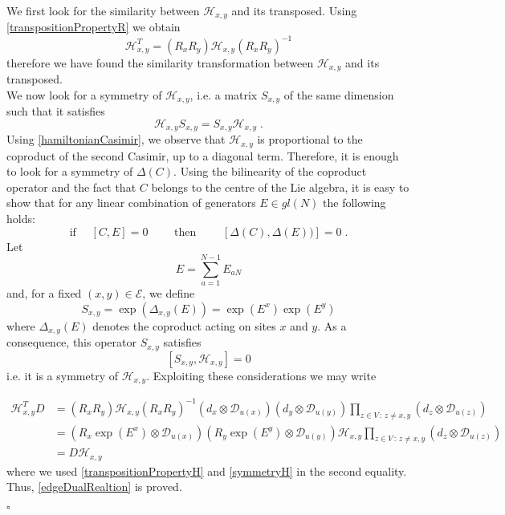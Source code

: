 \documentclass[10pt]{article}
\numberwithin{equation}{section}
\numberwithin{equation}{subsection}
\newcommand{\dt}{\;.}
\newcommand{\dd}{\mathcal{D}_{u(x)}}
\begin{document}
We first look for the similarity between $\mathcal{H}_{x,y}$ and its transposed. Using \eqref{transpositionPropertyR} we obtain  
\begin{equation}\label{transpositionPropertyH}
    \mathcal{H}_{x,y}^{T}=\left(R_{x}R_{y}\right)\mathcal{H}_{x,y}\left(R_{x}R_{y}\right)^{-1}
\end{equation}
therefore we have found the similarity transformation between $\mathcal{H}_{x,y}$ and its transposed. \\
We now look for a symmetry of $\mathcal{H}_{x,y}$, i.e. a matrix $S_{x,y}$ of the same dimension such that it satisfies 
\begin{equation}
	\mathcal{H}_{x,y}S_{x,y}=S_{x,y}\mathcal{H}_{x,y}
	\dt
\end{equation}
Using \eqref{hamiltonianCasimir}, we observe that $\mathcal{H}_{x,y}$ is proportional to the coproduct of the second Casimir, up to a diagonal term. Therefore, it is enough to look for a symmetry of $\Delta (C)$. Using the bilinearity of the coproduct operator and the fact that $C$ belongs to the centre of the Lie algebra, it is easy to show that for any linear combination of generators $E\in {gl}(N)$ the following holds:
\begin{equation}
 \text{if } \quad	[C,E]=0\qquad  \text{ then }\qquad \left[\Delta (C),\Delta(E)) \right]=0\dt
\end{equation}
Let
\begin{equation}
	E=\sum_{a=1}^{N-1}E_{aN}
\end{equation}
and, for a fixed $(x,y)\in \mathcal{E}$, we define
\begin{equation}
	S_{x,y}=\exp{(\Delta_{x,y}(E))}=\exp{(E^{x})}\exp{(E^{y})}
\end{equation}
where $\Delta_{x,y}(E)$ denotes the coproduct acting on sites $x$ and $y$. As a consequence, this operator $S_{x,y}$ satisfies
\begin{equation}\label{symmetryH}
	\left[S_{x,y},\mathcal{H}_{x,y}\right]=0
\end{equation}
i.e. it is a symmetry of $\mathcal{H}_{x,y}$. Exploiting these considerations we may write

\begin{equation}
    \begin{split}
        \mathcal{H}_{x,y}^{T}D&=(R_{x}R_{y})\mathcal{H}_{x,y}(R_{x}R_{y})^{-1}\left(d_{x}\otimes\dd\right)\left(d_{y}\otimes\mathcal{D}_{u(y)}\right)\prod_{z\in V\,:\, z\neq x,y}\left(d_{z}\otimes \mathcal{D}_{u(z)}\right)
        \\&=\left(R_{x}\exp{(E^{x})}\otimes \dd\right)\left(R_{y}\exp{(E^{y})}\otimes \mathcal{D}_{u(y)}\right)\mathcal{H}_{x,y}\prod_{z\in V\,:\, z\neq x,y}\left(d_{z}\otimes \mathcal{D}_{u(z)}\right)
        \\&=
        D\mathcal{H}_{x,y}
    \end{split}
\end{equation}
 where we used \eqref{transpositionPropertyH} and \eqref{symmetryH} in the second equality. Thus, \eqref{edgeDualRealtion} is proved. 
 \begin{flushright}
     $\square$
 \end{flushright}
\end{document}
